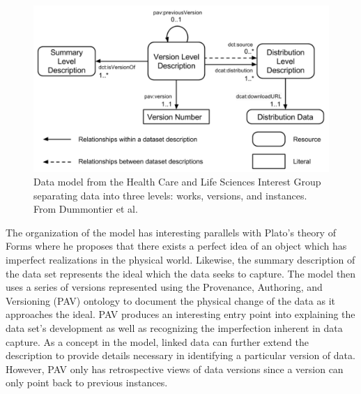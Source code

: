 \begin{figure}%
	\centering
	\includegraphics[scale=0.35]{figures/HCLSModel.png}
	\caption{Data model from the Health Care and Life Sciences Interest Group separating data into three levels: works, versions, and instances.  From Dummontier et al. \cite{Dummontier2016}}
	\label{HCLSModel}
\end{figure}

The organization of the model has interesting parallels with Plato's theory of Forms where he proposes that there exists a perfect idea of an object which has imperfect realizations in the physical world.
Likewise, the summary description of the data set represents the ideal which the data seeks to capture.
The model then uses a series of versions represented using the Provenance, Authoring, and Versioning (PAV) ontology to document the physical change of the data as it approaches the ideal\cite{Ciccarese2013}.
PAV produces an interesting entry point into explaining the data set's development as well as recognizing the imperfection inherent in data capture.
As a concept in the model, linked data can further extend the description to provide details necessary in identifying a particular version of data.
However, PAV only has retrospective views of data versions since a version can only point back to previous instances.

